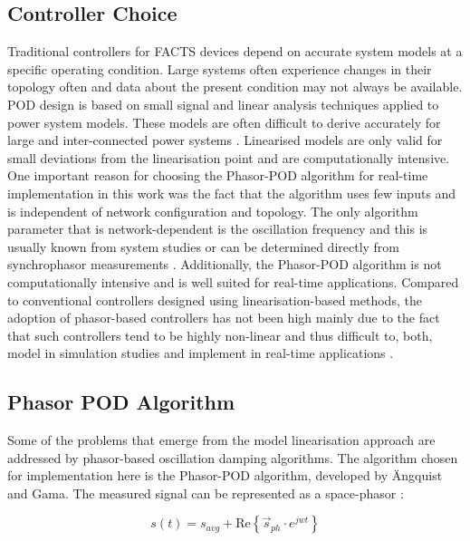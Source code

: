 \documentclass[journal]{IEEEtran}
\begin{document}
\subsection{Controller Choice}  %
Traditional controllers for FACTS devices depend on accurate system models at a specific operating condition. Large systems often experience changes in their topology often and data about the present condition may not always be available. POD design is based on small signal and linear analysis techniques applied to power system models. These models are often difficult to derive accurately for large and inter-connected power systems \cite{WAMTCSC}. Linearised models are only valid for small deviations from the linearisation point and are computationally intensive. One important reason for choosing the Phasor-POD algorithm for real-time implementation in this work was the fact that the algorithm uses few inputs and is independent of network configuration and topology. The only algorithm parameter that is network-dependent is the oscillation frequency and this is usually known from system studies or can be determined directly from synchrophasor measurements \cite{TaskForce}. Additionally, the Phasor-POD algorithm is not computationally intensive and is well suited for real-time applications. Compared to conventional controllers designed using linearisation-based methods, the adoption of phasor-based controllers has not been high mainly due to the fact that such controllers tend to be highly non-linear and thus difficult to, both, model in simulation studies \cite{Chaudhuri} and implement in real-time applications \cite{WAPODNorway}.

\subsection{Phasor POD Algorithm}

Some of the problems that emerge from the model linearisation approach are addressed by phasor-based oscillation damping algorithms. The algorithm chosen for implementation here is the Phasor-POD algorithm, developed by \"{A}ngquist and Gama\cite{PhasorPOD}. The measured signal can be represented as a space-phasor \cite{Chaudhuri}: 

\begin{equation}
s(t)={s}_{avg}+\mathrm{Re}\left\{{\stackrel{\to }{s}}_{ph}\cdot {e}^{{jwt}}\right\}
\end{equation}
\end{document}
